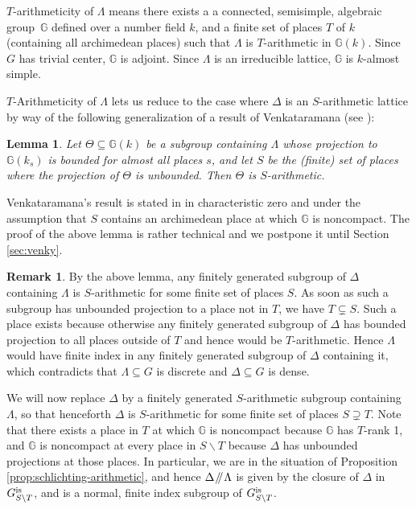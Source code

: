 \documentclass[JEP,XML,SOM,Unicode,published]{cedram}
\let\bs\backslash
\newcommand{\sslash}{\mathbin{\mkern-3mu /\mkern-5mu/ \mkern-3mu}}
\newcommand{\bbG}{\ensuremath{\mathbb{G}}}
\newtheorem{lemma}[thm]{Lemma}
\theoremstyle{definition}
\newtheorem{rem}[thm]{Remark}
\begin{document}
$T$-arithmeticity of $\Lambda$ means there exists a a connected, semisimple, algebraic group~$\bbG$ defined over a number field $k$, and a finite set of places $T$ of $k$ (containing all archimedean places) such that $\Lambda$ is $T$-arithmetic in $\bbG(k)$. Since $G$ has trivial center, $\bbG$ is adjoint. Since $\Lambda$ is an irreducible lattice, $\bbG$ is $k$-almost simple.

$T$-Arithmeticity of $\Lambda$ lets us reduce to the case where $\Delta$ is an $S$-arithmetic lattice by way of the following generalization of a result of Venkataramana (see \cite[Prop.\,2.3]{lubotzky-zimmer}):
\begin{lemma}\label{lem:gen-venky}
Let $\Theta\subseteq \bbG(k)$ be a subgroup containing $\Lambda$ whose projection to $\bbG(k_s)$ is bounded for almost all places $s$, and let $S$ be the (finite) set of places where the projection of $\Theta$ is unbounded. Then $\Theta$ is $S$-arithmetic.
\end{lemma}
Venkataramana's result is stated in \cite{lubotzky-zimmer} in characteristic zero and under the assumption that $S$ contains an archimedean place at which $\bbG$ is noncompact. The proof of the above lemma is rather technical and we postpone it until Section \ref{sec:venky}.

\begin{rem}\label{rem:one-prime}
By the above lemma, any finitely generated subgroup of $\Delta$ containing $\Lambda$ is $S$-arithmetic for some finite set of places $S$. As soon as such a subgroup has unbounded projection to a place not in $T$, we have $T\subsetneq S$. Such a place exists because otherwise any finitely generated subgroup of $\Delta$ has bounded projection to all places outside of $T$ and hence would be $T$-arithmetic. Hence $\Lambda$ would have finite index in any finitely generated subgroup of $\Delta$ containing it, which contradicts that $\Lambda\subseteq G$ is discrete and $\Delta\subseteq G$ is dense.

We will now replace $\Delta$ by a finitely generated $S$-arithmetic subgroup containing~$\Lambda$, so that henceforth $\Delta$ is $S$-arithmetic for some finite set of places $S\supsetneq T$. Note that there exists a place in $T$ at which $\bbG$ is noncompact because $\bbG$ has $T$-rank 1, and $\bbG$ is noncompact at every place in $S\bs T$ because $\Delta$ has unbounded projections at those places. In particular, we are in the situation of Proposition \ref{prop:schlichting-arithmetic}, and hence $\Delta\sslash\Lambda$ is given by the closure of $\Delta$ in $G_{S\bs T}^{\textup{is}}$, and is a normal, finite index subgroup of $G_{S\bs T}^{\textup{is}}$.
\end{rem}
\end{document}
